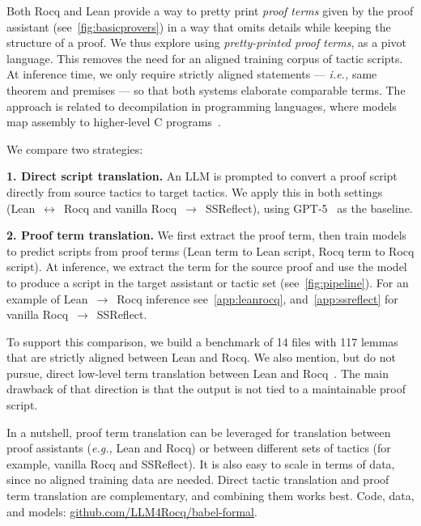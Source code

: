 \documentclass{article}
\newcommand{\ie}{\emph{i.e.,}\xspace}
\newcommand{\eg}{\emph{e.g.,}\xspace}
\begin{document}
Both Rocq and Lean provide a way to pretty print \emph{proof terms} given by
the proof assistant (see~\cref{fig:basicprovers}) in a way that omits
details while keeping the structure of a proof.
We thus explore using \emph{pretty-printed proof terms}, as a pivot language.
This removes the need for an aligned training corpus of tactic scripts. At inference time, we only require strictly aligned statements --- \ie same theorem and premises --- so that both systems elaborate comparable terms. The approach is related to decompilation in programming languages, where models map assembly to higher-level C programs~\cite{llm4decompile2024}.

We compare two strategies:

 \textbf{1. Direct script translation.} An LLM is prompted to convert
 a proof script directly from source tactics to target tactics. We
 apply this in both settings (Lean~$\leftrightarrow$~Rocq and vanilla
 Rocq~$\to$~SSReflect), using GPT-5~\cite{gpt52025} as the baseline.
 
\textbf{2. Proof term translation.} We first extract the proof term, then train models to predict scripts from proof terms (Lean term to Lean script, Rocq term to Rocq script). At inference, we extract the term for the source proof and use the model to produce a script in the target assistant or tactic set (see~\cref{fig:pipeline}). For an example of Lean~$\to$~Rocq inference see~\cref{app:leanrocq}, and~\cref{app:ssreflect} for vanilla Rocq~$\to$~SSReflect.

To support this comparison, we build a benchmark of 14 files with 117 lemmas that are strictly aligned between Lean and Rocq. We also mention, but do not pursue, direct low-level term translation between Lean and Rocq~\cite{leantypechecker}. The main drawback of that direction is that the output is not tied to a maintainable proof script.

In a nutshell, proof term translation can be leveraged for translation between proof assistants (\eg Lean and Rocq) or between different sets of tactics (for example, vanilla Rocq and SSReflect). It is also easy to scale in terms of data, since no aligned training data are needed. Direct tactic translation and proof term translation are complementary, and combining them works best. Code, data, and models: \href{https://github.com/LLM4Rocq/babel-formal}{github.com/LLM4Rocq/babel-formal}.
\end{document}
